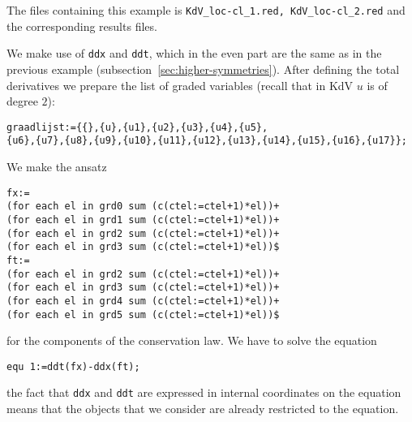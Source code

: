 The files containing this example is \texttt{KdV\_loc-cl\_1.red,
  KdV\_loc-cl\_2.red} and the corresponding results files.

We make use of \texttt{ddx} and \texttt{ddt}, which in the even part are the
same as in the previous example (subsection~\ref{sec:higher-symmetries}).
After defining the total derivatives we prepare the list of graded variables
(recall that in KdV $u$ is of degree $2$):
\begin{verbatim}
graadlijst:={{},{u},{u1},{u2},{u3},{u4},{u5},
{u6},{u7},{u8},{u9},{u10},{u11},{u12},{u13},{u14},{u15},{u16},{u17}};
\end{verbatim}
We make the ansatz
\begin{verbatim}
fx:=
(for each el in grd0 sum (c(ctel:=ctel+1)*el))+
(for each el in grd1 sum (c(ctel:=ctel+1)*el))+
(for each el in grd2 sum (c(ctel:=ctel+1)*el))+
(for each el in grd3 sum (c(ctel:=ctel+1)*el))$
ft:=
(for each el in grd2 sum (c(ctel:=ctel+1)*el))+
(for each el in grd3 sum (c(ctel:=ctel+1)*el))+
(for each el in grd4 sum (c(ctel:=ctel+1)*el))+
(for each el in grd5 sum (c(ctel:=ctel+1)*el))$
\end{verbatim}
for the components of the conservation law. We have to solve the equation
\begin{verbatim}
equ 1:=ddt(fx)-ddx(ft);
\end{verbatim}
the fact that \texttt{ddx} and \texttt{ddt} are expressed in internal
coordinates on the equation means that the objects that we consider are already
restricted to the equation.

